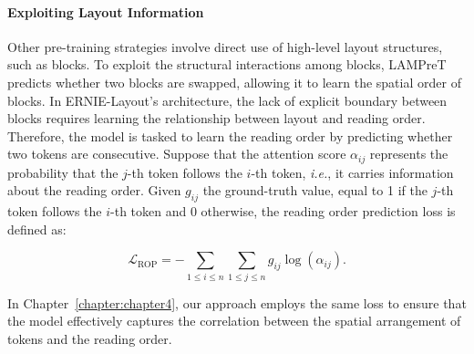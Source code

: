 \paragraph{Exploiting Layout Information}

Other pre-training strategies involve direct use of high-level layout structures, such as blocks. 
To exploit the structural interactions among blocks, \ac{LAMPreT} predicts whether two blocks are swapped, allowing it to learn the spatial order of blocks.
In ERNIE-Layout's architecture, the lack of explicit boundary between blocks requires learning the relationship between layout and reading order. Therefore, the model is tasked to learn the reading order by predicting whether two tokens are consecutive. Suppose that the attention score $\alpha_{ij}$ represents the probability that the $j$-th token follows the $i$-th token, \textit{i.e.}, it carries information about the reading order. Given $g_{ij}$ the ground-truth value, equal to 1 if the $j$-th token follows the $i$-th token and $0$ otherwise, the reading order prediction loss is defined as:

\begin{equation}
    \mathcal{L}_{\text{ROP}} = - \sum_{1 \leq i \leq n}\sum_{1 \leq j \leq n} g_{ij} \log(\alpha_{ij}).
\end{equation}

\noindent In Chapter~\ref{chapter:chapter4}, our approach employs the same loss to ensure that the model effectively captures the correlation between the spatial arrangement of tokens and the reading order.


